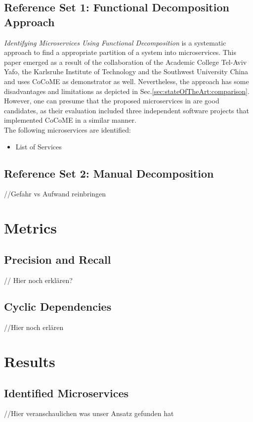 \subsection{Reference Set 1: Functional Decomposition Approach}
\textit{Identifying Microservices Using Functional Decomposition} \cite{FunctionalDecompositionHeinrich} is a systematic approach to find a appropriate partition of a system into microservices. This paper emerged as a result of the collaboration of the Academic College Tel-Aviv Yafo, the Karlsruhe Institute of Technology and the Southwest University China and uses CoCoME as demonstrator as well. Nevertheless, the approach has some disadvantages and limitations as depicted in Sec.\ref{sec:stateOfTheArt:comparison}. 
\\
However, one can presume that the proposed microservices in \cite{FunctionalDecompositionHeinrich} are good candidates, as their evaluation included three independent software projects that implemented CoCoME in a similar manner. \\
The following microservices are identified: 
\begin{itemize}
    \item  List of Services
\end{itemize}

\subsection{Reference Set 2: Manual Decomposition}
//Gefahr vs Aufwand reinbringen

\section{Metrics}
\label{sec:Evaluation:Metrics}

\subsection{Precision and Recall}
// Hier noch erklären?

\subsection{Cyclic Dependencies}
//Hier noch erlären

\section{Results}
\label{sec:Evalutation:Results}

\subsection{Identified Microservices}
//Hier veranschaulichen was unser Ansatz gefunden hat


